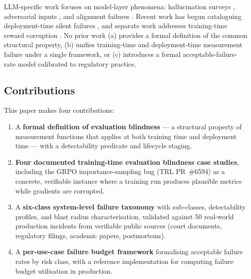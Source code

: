 \documentclass{article}
\begin{document}
LLM-specific work focuses on model-layer phenomena: hallucination surveys
\citep{ji2023hallucination, huang2023survey}, adversarial inputs
\citep{wei2023jailbroken, perez2022injection, greshake2023indirect}, and
alignment failures \citep{bai2022constitutional}.  Recent work has begun
cataloguing deployment-time silent failures
\citep{shen2025silent, kumar2025deployment, liu2025blindspot,
pandey2026evaluating}, and separate
work addresses training-time reward corruption \citep{gao2025rewardhacking}.
No prior work (a) provides a formal definition of the common structural
property, (b) unifies training-time and deployment-time measurement failure
under a single framework, or (c) introduces a formal acceptable-failure-rate
model calibrated to regulatory practice.

\subsection{Contributions}

This paper makes four contributions:

\begin{enumerate}
  \item A \textbf{formal definition of evaluation blindness} --- a structural
        property of measurement functions that applies at both training time
        and deployment time --- with a detectability predicate and lifecycle
        staging.

  \item \textbf{Four documented training-time evaluation blindness case studies},
        including the GRPO importance-sampling bug (TRL PR~\#6594) as a
        concrete, verifiable instance where a training run produces plausible
        metrics while gradients are corrupted.

  \item A \textbf{six-class system-level failure taxonomy} with sub-classes,
        detectability profiles, and blast radius characterisation, validated
        against 50 real-world production incidents from verifiable public
        sources (court documents, regulatory filings, academic papers,
        postmortems).

  \item A \textbf{per-use-case failure budget framework} formalising acceptable
        failure rates by risk class, with a reference implementation for
        computing failure budget utilisation in production.
\end{enumerate}
\end{document}
